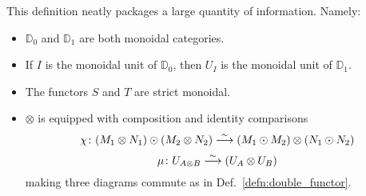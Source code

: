 This definition neatly packages a large quantity of information.   Namely:
\begin{itemize}
\item $\mathbb{D}_0$ and $\mathbb{D}_1$ are both monoidal categories.
\item If $I$ is the monoidal unit of $\mathbb{D}_0$, then $U_I$ is the
monoidal unit of $\mathbb{D}_1$.
\item The functors $S$ and $T$ are strict monoidal.
\item $\otimes$ is equipped with composition and identity comparisons
\[ \chi \colon (M_1\otimes N_1)\odot (M_2\otimes N_2) \stackrel{\sim}{\longrightarrow}
(M_1\odot M_2)\otimes (N_1\odot N_2)\]
\[ \mu \colon U_{A\otimes B} \stackrel{\sim}{\longrightarrow} (U_A \otimes U_B)\]
making three diagrams commute as in Def.\ \ref{defn:double_functor}.


\end{itemize}
